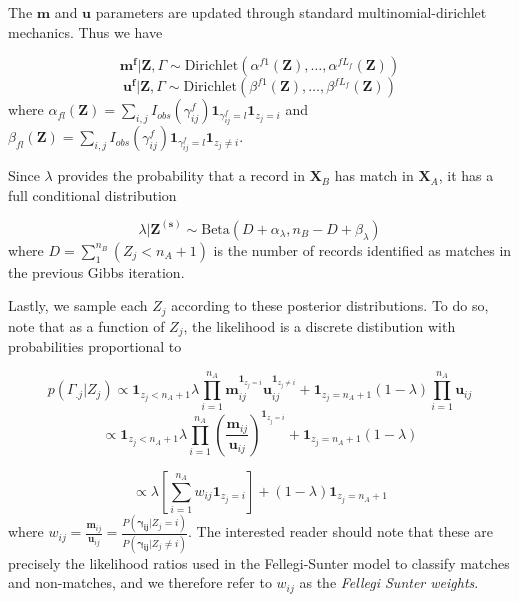 \documentclass[
  12pt,
]{article}
\begin{document}
The \(\mathbf{m}\) and \(\mathbf{u}\) parameters are updated through
standard multinomial-dirichlet mechanics. Thus we have

\[\mathbf{m^{f}}|\mathbf{Z}, \Gamma \sim \text{Dirichlet}(\alpha^{f1}(\mathbf{Z}), \ldots, \alpha^{fL_f}(\mathbf{Z}))\]
\[\mathbf{u^{f}}|\mathbf{Z}, \Gamma \sim \text{Dirichlet}(\beta^{f1}(\mathbf{Z}), \ldots, \beta^{fL_f}(\mathbf{Z}))\]
where
\(\alpha_{fl}(\mathbf{Z})= \sum_{i,j} I_{obs}(\gamma_{ij}^f)\mathbf{1}_{\gamma_{ij}^f = l} \mathbf{1}_{z_j = i}\)
and
\(\beta_{fl}(\mathbf{Z})= \sum_{i,j} I_{obs}(\gamma_{ij}^f)\mathbf{1}_{\gamma_{ij}^f = l} \mathbf{1}_{z_j \neq i}\).

Since \(\lambda\) provides the probability that a record in
\(\mathbf{X}_B\) has match in \(\mathbf{X}_A\), it has a full
conditional distribution

\[\lambda|\mathbf{Z^{(s)}} \sim \text{Beta}(D + \alpha_{\lambda}, n_B - D + \beta_{\lambda})\]
where \(D = \sum_1^{n_B} (Z_j < n_A + 1)\) is the number of records
identified as matches in the previous Gibbs iteration.

Lastly, we sample each \(Z_j\) according to these posterior
distributions. To do so, note that as a function of \(Z_j\), the
likelihood is a discrete distibution with probabilities proportional to

\[p(\Gamma_{.j}|Z_{j}) \propto \mathbf{1}_{z_j < n_A + 1}\lambda\prod_{i=1}^{n_A}\mathbf{m}_{ij}^{\mathbf{1}_{z_j = i}}\mathbf{u}_{ij}^{\mathbf{1}_{z_j \neq i}} + \mathbf{1}_{z_j = n_A + 1}(1-\lambda)\prod_{i=1}^{n_A}\mathbf{u}_{ij}\]
\[\propto \mathbf{1}_{z_j < n_A + 1}\lambda\prod_{i=1}^{n_A}\left(\frac{\mathbf{m}_{ij}}{\mathbf{u}_{ij}}\right)^{\mathbf{1}_{z_j = i}}+ \mathbf{1}_{z_j = n_A + 1}(1-\lambda)\]

\[\propto \lambda \left[\sum_{i=1}^{n_A}w_{ij}\mathbf{1}_{z_j = i}\right] + (1 - \lambda)\mathbf{1}_{z_j = n_A + 1}\]
where
\(w_{ij} = \frac{\mathbf{m}_{ij}}{\mathbf{u}_{ij}} = \frac{P(\boldsymbol{\gamma_{ij}}|Z_j = i)}{P(\boldsymbol{\gamma_{ij}} |Z_j \neq i)}\).
The interested reader should note that these are precisely the
likelihood ratios used in the Fellegi-Sunter model to classify matches
and non-matches, and we therefore refer to \(w_{ij}\) as the
\emph{Fellegi Sunter weights}.
\end{document}
